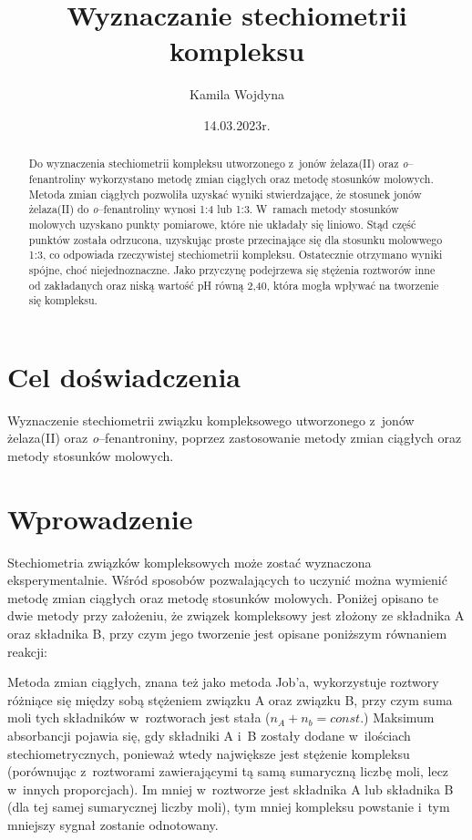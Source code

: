 \documentclass[12pt]{article}
\title{Wyznaczanie stechiometrii kompleksu}
\author{Kamila Wojdyna}
\date{14.03.2023r.}
\begin{document}
\maketitle


\begin{abstract}
    Do wyznaczenia stechiometrii kompleksu utworzonego z~jonów żelaza(II) oraz \textit{o}--fenantroliny wykorzystano metodę zmian ciągłych oraz metodę stosunków molowych. Metoda zmian ciągłych pozwoliła uzyskać wyniki stwierdzające, że stosunek jonów żelaza(II) do \textit{o}--fenantroliny wynosi 1:4 lub 1:3. W~ramach metody stosunków molowych uzyskano punkty pomiarowe, które nie układały się liniowo. Stąd część punktów została odrzucona, uzyskując proste przecinające się dla stosunku molowwego 1:3, co odpowiada rzeczywistej stechiometrii kompleksu. Ostatecznie otrzymano wyniki spójne, choć niejednoznaczne. Jako przyczynę podejrzewa się stężenia roztworów inne od zakładanych oraz niską wartość pH równą 2,40, która mogła wpływać na tworzenie się kompleksu.
\end{abstract}


\section{Cel doświadczenia}

Wyznaczenie stechiometrii związku kompleksowego utworzonego z~jonów żelaza(II) oraz \textit{o}--fenantroniny, poprzez zastosowanie metody zmian ciągłych oraz metody stosunków molowych.



\section{Wprowadzenie}

Stechiometria związków kompleksowych może zostać wyznaczona eksperymentalnie. Wśród sposobów pozwalających to uczynić można wymienić metodę zmian ciągłych oraz metodę stosunków molowych. Poniżej opisano te dwie metody przy założeniu, że związek kompleksowy jest złożony ze składnika A oraz składnika B, przy czym jego tworzenie jest opisane poniższym równaniem reakcji:

\begin{center}
\end{center}



Metoda zmian ciągłych, znana też jako metoda Job'a, wykorzystuje
roztwory różniące się między sobą stężeniem związku A oraz związku B, przy czym suma moli tych składników w~roztworach jest stała ($n_A + n_b = const.$) Maksimum absorbancji pojawia się, gdy składniki A i~B zostały dodane w~ilościach stechiometrycznych, ponieważ wtedy największe jest stężenie kompleksu (porównując z~roztworami zawierającymi tą samą sumaryczną liczbę moli, lecz w~innych proporcjach). Im mniej w~roztworze jest składnika A lub składnika B (dla tej samej sumarycznej liczby moli), tym mniej kompleksu powstanie i~tym mniejszy sygnał zostanie odnotowany.
\end{document}
